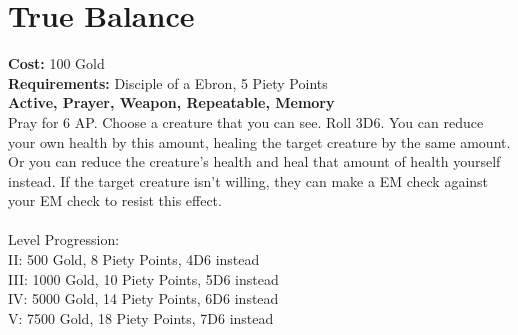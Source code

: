 \section{True Balance}
\textbf{Cost:} 100 Gold\\
\textbf{Requirements:} Disciple of a Ebron, 5 Piety Points \\
\textbf{Active, Prayer, Weapon, Repeatable, Memory}\\
Pray for 6 AP. Choose a creature that you can see. Roll 3D6. You can reduce your own health by this amount, healing the target creature by the same amount. Or you can reduce the creature's health and heal that amount of health yourself instead. If the target creature isn't willing, they can make a EM check against your EM check to resist this effect.\\
\\
Level Progression:\\
II: 500 Gold, 8 Piety Points, 4D6 instead\\
III: 1000 Gold, 10 Piety Points, 5D6 instead\\
IV: 5000 Gold, 14 Piety Points, 6D6 instead\\
V: 7500 Gold, 18 Piety Points, 7D6 instead\\